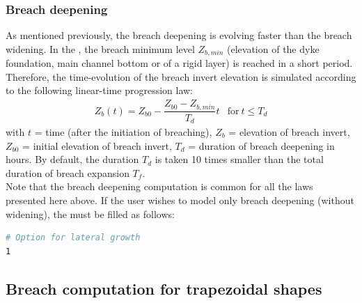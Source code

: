 \subsubsection{Breach deepening}
As mentioned previously, the breach deepening is evolving faster than the breach
widening.
In the \telemacsystem, the breach minimum level $Z_{b,min}$ (elevation
of the dyke foundation, main channel bottom or of a rigid layer) is reached in a
short period.
Therefore, the time-evolution of the breach invert elevation is simulated
according to the following linear-time progression law:
\begin{equation}
\begin{array}{lc}
Z_b(t)=Z_{b0}-\dfrac{Z_{b0}-Z_{b,min}}{T_d}t & \text{for}~t\leq T_d
\end{array}
\end{equation}
with $t$ = time (after the initiation of breaching), $Z_b$ = elevation of breach
invert, $Z_{b0}$ = initial elevation of breach invert, $T_d$ = duration of breach
deepening in hours.
By default, the duration $T_d$ is taken 10 times smaller than the total duration
of breach expansion $T_f$.\\
Note that the breach deepening computation is common for all the laws presented
here above.
If the user wishes to model only breach deepening (without widening),
the  must be filled as follows:
\begin{lstlisting}[language=bash]
# Option for lateral growth
1
\end{lstlisting}
\subsection{Breach computation for trapezoidal shapes}

